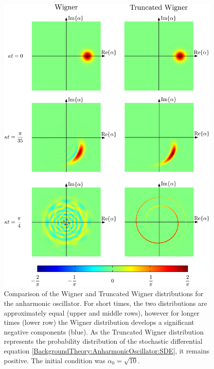 \begin{figure}
    \centering
    \includegraphics[width=14cm]{WignerTruncatedWignerComparison}
    \caption{
        Comparison of the Wigner and Truncated Wigner distributions for the anharmonic oscillator.  For short times, the two distributions are approximately equal (upper and middle rows), however for longer times (lower row) the Wigner distribution develops a significant negative components (blue).  As the Truncated Wigner distribution represents the probability distribution of the stochastic differential equation \eqref{BackgroundTheory:AnharmonicOscillator:SDE}, it remains positive.  The initial condition was $\alpha_0 = \sqrt{10}$. \label{BackgroundTheory:WignerTruncatedWignerComparison}
    }
\end{figure}

\parasep

